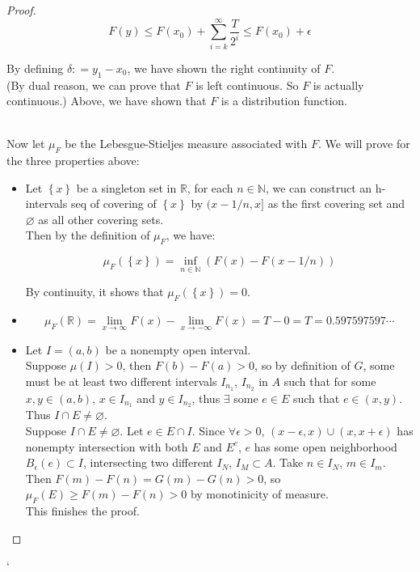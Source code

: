 \documentclass{qlnotes-export}
\begin{document}
\begin{proof}
\[F(y) \leq F(x_{0}) + \sum\limits_{i = k}^{\infty}\frac{T}{2^{i}} \leq F(x_{0}) + \epsilon\]

By defining \(\delta: = y_{1} - x_{0}\), we have shown the right continuity of \(F\).\\
(By dual reason, we can prove that \(F\) is left continuous. So \(F\) is actually continuous.) Above, we have shown that \(F\) is a distribution function.\\
\strut \\
Now let \(\mu_{F}\) be the Lebesgue-Stieljes measure associated with \(F\). We will prove for the three properties above:\\

\begin{itemize}
\item
  Let \(\left\{ x \right\}\) be a singleton set in \(\mathbb{R}\), for each \(n \in {\mathbb{N}}\), we can construct an h-intervals seq of covering of \(\left\{ x \right\}\) by \((x - 1/n,x\rbrack\) as the first covering set and \(\varnothing\) as all other covering sets.\\
  Then by the definition of \(\mu_{F}\), we have:

  \[\mu_{F}(\left\{ x \right\}) = \inf\limits_{n \in {\mathbb{N}}}(F(x) - F(x - 1/n))\]

  By continuity, it shows that \(\mu_{F}(\left\{ x \right\}) = 0\).
\item
  \[\mu_{F}({\mathbb{R}}) = \lim\limits_{x\rightarrow\infty}F(x) - \lim\limits_{x\rightarrow - \infty}F(x) = T - 0 = T = 0.597597597\cdots\]
\item
  Let \(I = (a,b)\) be a nonempty open interval.\\
  Suppose \(\mu(I) > 0\), then \(F(b) - F(a) > 0\), so by definition of \(G\), some must be at least two different intervals \(I_{n_{1}}\), \(I_{n_{2}}\) in \(A\) such that for some \(x,y \in (a,b)\), \(x \in I_{n_{1}}\) and \(y \in I_{n_{2}}\), thus \(\exists\) some \(e \in E\) such that \(e \in (x,y)\). Thus \(I \cap E \neq \varnothing\).\\
  Suppose \(I \cap E \neq \varnothing\). Let \(e \in E \cap I\). Since \(\forall\epsilon > 0\), \((x - \epsilon,x) \cup (x,x + \epsilon)\) has nonempty intersection with both \(E\) and \(E^{c}\), \(e\) has some open neighborhood \(B_{\epsilon}(e) \subset I\), intersecting two different \(I_{N}\), \(I_{M} \subset A\). Take \(n \in I_{N}\), \(m \in I_{m}\). Then \(F(m) - F(n) = G(m) - G(n) > 0\), so \(\mu_{F}(E) \geq F(m) - F(n) > 0\) by monotinicity of measure.\\
  This finishes the proof.
\end{itemize}

\end{proof}

`
\end{document}
